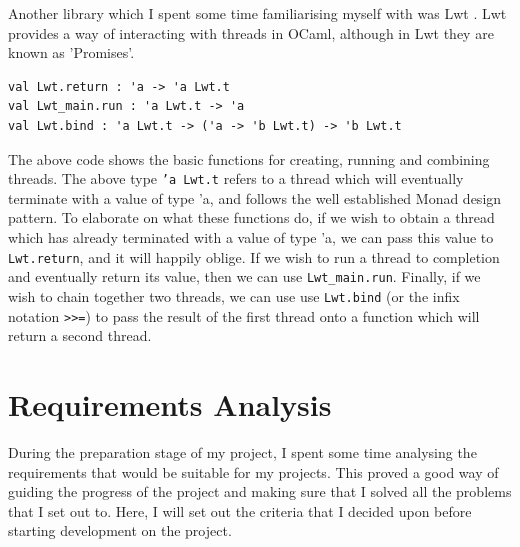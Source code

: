 \documentclass[12pt,a4paper,twoside,openright]{report}
\begin{document}
		Another library which I spent some time familiarising myself with was Lwt \cite{Lwt}. 
		Lwt provides a way of interacting with threads in OCaml, although in Lwt they are known as 'Promises'.
		\begin{lstlisting}
val Lwt.return : 'a -> 'a Lwt.t 
val Lwt_main.run : 'a Lwt.t -> 'a
val Lwt.bind : 'a Lwt.t -> ('a -> 'b Lwt.t) -> 'b Lwt.t
		\end{lstlisting}
		The above code shows the basic functions for creating, running and combining threads.
		The above type \texttt{'a Lwt.t} refers to a thread which will eventually terminate with a value of type 'a, and follows the well established Monad design pattern.
		To elaborate on what these functions do, if we wish to obtain a thread which has already terminated with a value of type 'a, we can pass this value to \texttt{Lwt.return}, and it will happily oblige. If we wish to run a thread to completion and eventually return its value, then we can use \texttt{Lwt\_main.run}. Finally, if we wish to chain together two threads, we can use use \texttt{Lwt.bind} (or the infix notation \texttt{>>=}) to pass the result of the first thread onto a function which will return a second thread.

	\section{Requirements Analysis} \label{Requirements Analysis}
	During the preparation stage of my project, I spent some time analysing the requirements that would be suitable for my projects. This proved a good way of guiding the progress of the project and making sure that I solved all the problems that I set out to. Here, I will set out the criteria that I decided upon before starting development on the project.
\end{document}
